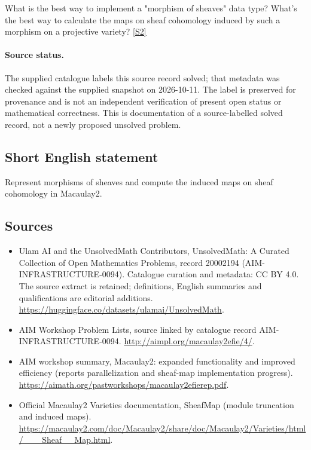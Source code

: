 \documentclass[11pt]{article}
\newcommand{\sref}[2]{\hyperlink{source:#1:#2}{[S#2]}}
\begin{document}
What is the best way to implement a "morphism of sheaves" data type? What's the best way to calculate the maps on sheaf cohomology induced by such a morphism on a projective variety? \sref{20002194}{2}
\paragraph{Source status.}
The supplied catalogue labels this source record solved; that metadata was checked against the supplied snapshot on 2026-10-11. The label is preserved for provenance and is not an independent verification of present open status or mathematical correctness. This is documentation of a source-labelled solved record, not a newly proposed unsolved problem.
\subsection{Short English statement}
Represent morphisms of sheaves and compute the induced maps on sheaf cohomology in Macaulay2.
\subsection{Sources}
\begin{itemize}
\item[\hypertarget{source:20002194:1}{S1}] Ulam AI and the UnsolvedMath Contributors, UnsolvedMath: A Curated Collection of Open Mathematics Problems, record 20002194 (AIM-INFRASTRUCTURE-0094). Catalogue curation and metadata: CC BY 4.0. The source extract is retained; definitions, English summaries and qualifications are editorial additions.
\url{https://huggingface.co/datasets/ulamai/UnsolvedMath}.
\item[\hypertarget{source:20002194:2}{S2}] AIM Workshop Problem Lists, source linked by catalogue record AIM-INFRASTRUCTURE-0094.
\url{http://aimpl.org/macaulay2efie/4/}.
\item[\hypertarget{source:20002194:3}{S3}] AIM workshop summary, Macaulay2: expanded functionality and improved efficiency (reports parallelization and sheaf-map implementation progress).
\url{https://aimath.org/pastworkshops/macaulay2efierep.pdf}.
\item[\hypertarget{source:20002194:4}{S4}] Official Macaulay2 Varieties documentation, SheafMap (module truncation and induced maps).
\url{https://macaulay2.com/doc/Macaulay2/share/doc/Macaulay2/Varieties/html/___Sheaf__Map.html}.
\end{itemize}
\end{document}
